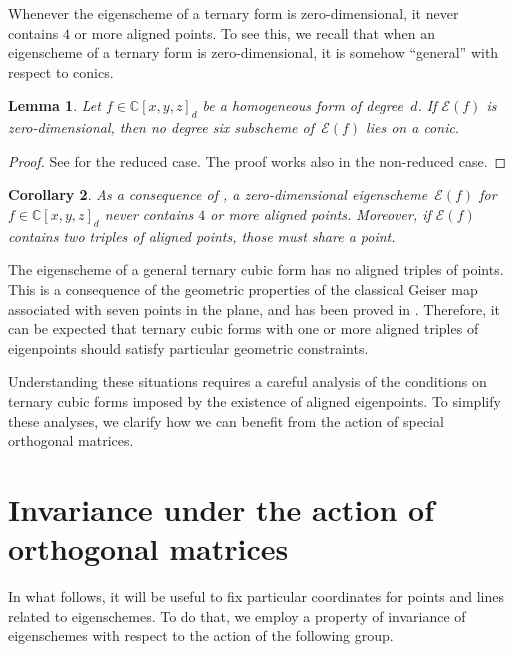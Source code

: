 \documentclass{amsart}
\theoremstyle{plain}
\newtheorem{lemma}{Lemma}[section]
\newtheorem{corollary}[lemma]{Corollary}
\theoremstyle{definition}
\newcommand{\C}{\mathbb{C}}
\newcommand{\Eig}[1]{\mathcal{E}\!\left( {#1} \right)}
\begin{document}
Whenever the eigenscheme of a ternary form is zero-dimensional, it never contains $4$ or more aligned points.
To see this, we recall that when an eigenscheme of a ternary form is zero-dimensional, it is somehow ``general'' with respect to conics.

\begin{lemma}
\label{lemma:no_six_conic}
Let $f \in \C[x,y,z]_d$ be a homogeneous form of degree~$d$.
If $\Eig{f}$ is zero-dimensional,
then no degree six subscheme of~$\Eig{f}$ lies on a conic.
\end{lemma}
\begin{proof}
See \cite[Lemma~9.1]{OS1} for the reduced case.
The proof works also in the non-reduced case.
\end{proof}

\begin{corollary}
\label{corollary:general_no_triple}
As a consequence of , a zero-dimensional eigenscheme~$\Eig{f}$ for $f \in \C[x,y,z]_d$ never contains $4$ or more aligned points.
Moreover, if $\Eig{f}$ contains two triples of aligned points, those must share a point.
\end{corollary}

The eigenscheme of a general ternary cubic form has no aligned triples of points. This is a consequence of the geometric properties of the classical Geiser map associated with seven points in the plane, and has been proved in \cite[Proposition~4.5]{BGV}.
Therefore, it can be expected that ternary cubic forms with one or more aligned triples of eigenpoints should satisfy particular geometric constraints.

Understanding these situations requires a careful analysis of the conditions on ternary cubic forms imposed by the existence of aligned eigenpoints.
To simplify these analyses, we clarify how we can benefit from the action of special orthogonal matrices.

\section{Invariance under the action of orthogonal matrices}
\label{invariance}

In what follows, it will be useful to fix particular coordinates for points and lines related to eigenschemes. To do that, we employ a property of invariance of eigenschemes with respect to the action of the following group.
\end{document}
